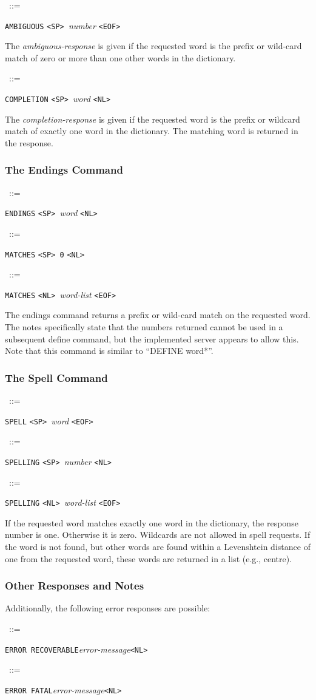 \documentclass{article}
\newcommand{\SP}{\mbox{\tt <SP>\ }}
\newcommand{\NL}{\mbox{\tt <NL>\ }}
\newcommand{\EOF}{\mbox{\tt <EOF>\ }}
\newcommand{\note}{\bigskip\par\noindent}
\newcommand{\prd}[3][]{\noindent\begin{leftline}\hspace{1em}{\it #2}\ ::=\ %
  \begin{minipage}[t]{.64\textwidth}\raggedright #3\end{minipage}%
    \ifthenelse{\equal{#1}{}}{}%
    {\begin{minipage}[t]{.54\textwidth}\raggedright #1\end{minipage}%
      \vspace{1ex}}%
    \end{leftline}}
\newcommand{\lhs}[1]{{\it #1\/}}
\newcommand{\lit}[1]{{\tt #1}}
\begin{document}
\prd{ambiguous-response}{\lit{AMBIGUOUS} \SP \lhs{number} \EOF}

\note The \lhs{ambiguous-response} is given if the requested word is the
prefix or wild-card match of zero or more than one other words in the
dictionary.\note

\prd{completion-response}{\lit{COMPLETION} \SP \lhs{word} \NL}

\note The \lhs{completion-response} is given if the requested word is the
prefix or wildcard match of exactly one word in the dictionary.  The
matching word is returned in the response.


\subsubsection{The Endings Command}

\prd{endings}{\lit{ENDINGS} \SP \lhs{word} \NL}
\prd{endings-response}{\lit{MATCHES} \SP \lit{0} \NL}
\prd{endings-response}{\lit{MATCHES} \NL \lhs{word-list} \EOF}

\note The endings command returns a prefix or wild-card match on the
requested word.  The notes specifically state that the numbers returned
cannot be used in a subsequent define command, but the implemented server
appears to allow this.  Note that this command is similar to ``DEFINE
word*''.


\subsubsection{The Spell Command}

\prd{spell}{\lit{SPELL} \SP \lhs{word} \EOF}
\prd{spell-response}{\lit{SPELLING} \SP \lhs{number} \NL}
\prd{spell-response}{\lit{SPELLING} \NL \lhs{word-list} \EOF}

\note If the requested word matches exactly one word in the dictionary, the
response number is one.  Otherwise it is zero.  Wildcards are not allowed
in spell requests.  If the word is not found, but other words are found
within a Levenshtein distance of one from the requested word, these words
are returned in a list (e.g., centre).

\subsubsection{Other Responses and Notes}

Additionally, the following error responses are possible:

\prd{error}{\lit{ERROR RECOVERABLE}\lhs{error-message}\NL}
\prd{error}{\lit{ERROR FATAL}\lhs{error-message}\NL}
\end{document}
